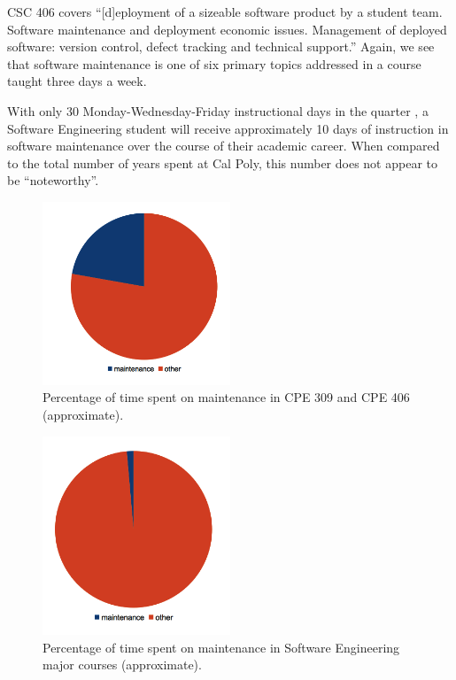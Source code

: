 \documentclass[11pt]{article}
\begin{document}
\begin{multicols}{2}
CSC 406 covers ``[d]eployment of a sizeable software product by a student team. Software maintenance and deployment economic issues. Management of deployed  software: version control, defect tracking and technical support.'' \cite{catalogCourses}  Again, we see that software maintenance is one of six primary topics addressed in a course taught three days a week. \cite{406Schedule}

With only 30 Monday-Wednesday-Friday instructional days in the quarter \cite{polyCalendar}, a Software Engineering student will receive approximately 10 days of instruction in software maintenance over the course of their academic career.  When compared to the total number of years spent at Cal Poly, this number does not appear to be ``noteworthy''.

\begin{figure}[tb!]
  \caption{Percentage of time spent on maintenance in CPE 309 and CPE 406 (approximate).}
  \centering
    \includegraphics[width=0.5\textwidth]{termpaper/images/pie-chart-01}
\end{figure}

\begin{figure}[tb!]
  \caption{Percentage of time spent on maintenance in Software Engineering major courses (approximate).}
  \centering
    \includegraphics[width=0.5\textwidth]{termpaper/images/pie-chart-02}
\end{figure}


\end{multicols}
\end{document}
